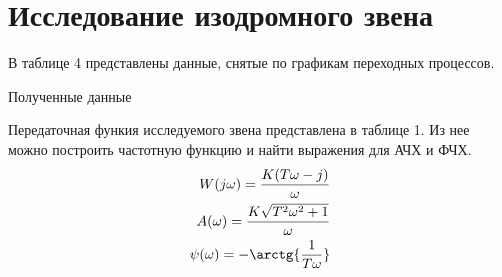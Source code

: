 \documentclass[a4paper, 12pt]{article}
\begin{document}
\newpage
\section{Исследование изодромного звена}
В таблице 4 представлены данные, снятые по графикам переходных процессов.
\begin{table}[h!]
    \centering
    \begin{threeparttable}
        \caption{Полученные данные}
    \end{threeparttable}
\end{table}

Передаточная функия исследуемого звена представлена в таблице 1. Из нее можно построить частотную функцию и найти выражения для АЧХ и ФЧХ.
\begin{align}
    W(j\omega) = \frac{K(T\omega - j)}{\omega} \\
    A(\omega) = \frac{K\sqrt{T^2\omega^2 + 1}}{\omega} \\
    \psi(\omega) = -\arctg{\frac{1}{T\omega}}
\end{align}
\end{document}
